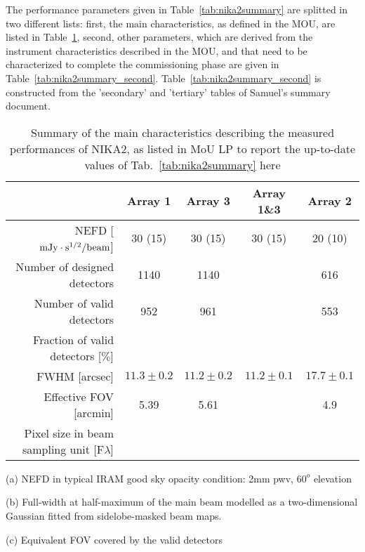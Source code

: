 The performance parameters given in Table~\ref{tab:nika2summary} are
splitted in two different lists: first, the main characteristics, as
defined in the MOU, are listed in Table~\ref{tab:nika2summary_main},
second, other parameters, which are derived from the instrument
characteristics described in the MOU, and that need to be
characterized to complete the commissioning phase are given in
Table~\ref{tab:nika2summary_second}. Table~\ref{tab:nika2summary_second} is
constructed from the 'secondary' and 'tertiary' tables of Samuel's
summary document.


\begin{table}[h]
  \caption[Main performance requirement]{Summary of the main characteristics describing the measured performances of NIKA2, as listed in MoU {\color{magenta} LP to report the up-to-date values of Tab.~\ref{tab:nika2summary} here}}
  \label{tab:nika2summary_main}
  \begin{threeparttable}
    \begin{tabular}{|r|c|c|c|c|}
      \hline
      & Array 1 & Array 3  & Array 1\&3 & Array 2 \\
      \hline
      \hline
      NEFD\tnote{a}\hspace{1mm}   [$\rm{mJy} \cdot \rm{s}^{1/2}/\rm{beam}$]  &  30 (15)   & 30 (15)  &  30 (15)  & 20 (10) \\
      Number of designed detectors       & 1140      &  1140    &    &    616  \\
      Number of valid detectors          &  952      &   961    &    &    553  \\
      Fraction of valid detectors [$\%$] &           &          &    &         \\
      \hline
      FWHM\tnote{b}\hspace{1mm} [arcsec]  &  $11.3 \pm 0.2$   &  $11.2 \pm 0.2$  &   $11.2 \pm 0.1$  &  $17.7 \pm 0.1$ \\
      \hline
      Effective FOV\tnote{c}\hspace{1mm} [arcmin]    &   5.39    &   5.61    &    &   4.9  \\
      \hline
      Pixel size in beam sampling unit [F$\lambda$]  &    &   &    &   \\
      \hline      
\end{tabular}
  \begin{tablenotes}
  \item[(a)] NEFD in typical IRAM good sky opacity condition: 2mm pwv, $60^o$ elevation
  \item[(b)] Full-width at half-maximum of the main beam modelled as a two-dimensional Gaussian fitted from sidelobe-masked beam maps.
  \item[(c)] Equivalent FOV covered by the valid detectors
    \end{tablenotes}
\end{threeparttable}
\end{table} 


